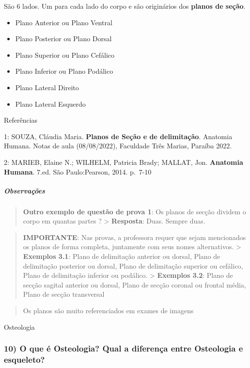 \documentclass[
]{book}
\providecommand{\tightlist}{%
  \setlength{\itemsep}{0pt}\setlength{\parskip}{0pt}}
\begin{document}
São 6 lados. Um para cada lado do corpo e são originários dos \textbf{planos de seção}.

\begin{itemize}
\tightlist
\item
  Plano Anterior ou Plano Ventral
\item
  Plano Posterior ou Plano Dorsal
\item
  Plano Superior ou Plano Cefálico
\item
  Plano Inferior ou Plano Podálico
\item
  Plano Lateral Direito
\item
  Plano Lateral Esquerdo
\end{itemize}

Referências

1: SOUZA, Cláudia Maria. \textbf{Planos de Seção e de delimitação}. Anatomia Humana. Notas de aula (08/08/2022), Faculdade Três Marias, Paraíba 2022.

2: MARIEB, Elaine N.; WILHELM, Patricia Brady; MALLAT, Jon. \textbf{Anatomia Humana}. 7.ed. São Paulo:Pearson, 2014. p.~7-10

\hypertarget{observauxe7uxf5es}{%
\subparagraph{Observações}\label{observauxe7uxf5es}}

\begin{quote}
\textbf{Outro exemplo de questão de prova 1}: Os planos de secção dividem o corpo em quantas partes ?
\textgreater{} \textbf{Resposta}: Duas. Sempre duas.
\end{quote}

\begin{quote}
\textbf{IMPORTANTE}: Nas provas, a professora requer que sejam mencionados os planos de forma completa, juntamente com seus nomes alternativos.
\textgreater{} \textbf{Exemplos 3.1}: Plano de delimitação anterior ou dorsal, Plano de delimitação posterior ou dorsal, Plano de delimitação superior ou cefálico, Plano de delimitação inferior ou podálico.
\textgreater{} \textbf{Exemplos 3.2}: Plano de secção sagital anterior ou dorsal, Plano de secção coronal ou frontal média, Plano de secção transversal
\end{quote}

\begin{quote}
Os planos são muito referenciados em exames de imagens
\end{quote}

Osteologia

\hypertarget{o-que-uxe9-osteologia-qual-a-diferenuxe7a-entre-osteologia-e-esqueleto}{%
\subsubsection*{10) O que é Osteologia? Qual a diferença entre Osteologia e esqueleto?}\label{o-que-uxe9-osteologia-qual-a-diferenuxe7a-entre-osteologia-e-esqueleto}}
\end{document}
